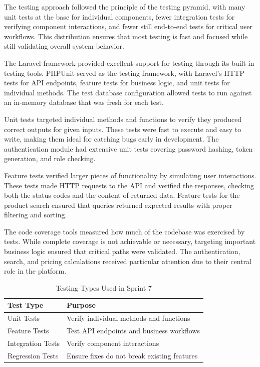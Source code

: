 The testing approach followed the principle of the testing
pyramid, with many unit tests at the base for individual
components, fewer integration tests for verifying component
interactions, and fewer still end-to-end tests for critical
user workflows. This distribution ensures that most testing
is fast and focused while still validating overall system
behavior.

The Laravel framework provided excellent support for testing
through its built-in testing tools. PHPUnit served as the
testing framework, with Laravel's HTTP tests for API endpoints,
feature tests for business logic, and unit tests for individual
methods. The test database configuration allowed tests to run
against an in-memory database that was fresh for each test.

Unit tests targeted individual methods and functions to verify
they produced correct outputs for given inputs. These tests were
fast to execute and easy to write, making them ideal for
catching bugs early in development. The authentication module
had extensive unit tests covering password hashing, token
generation, and role checking.

Feature tests verified larger pieces of functionality by
simulating user interactions. These tests made HTTP requests
to the API and verified the responses, checking both the
status codes and the content of returned data. Feature tests
for the product search ensured that queries returned expected
results with proper filtering and sorting.

The code coverage tools measured how much of the codebase
was exercised by tests. While complete coverage is not
achievable or necessary, targeting important business logic
ensured that critical paths were validated. The authentication,
search, and pricing calculations received particular attention
due to their central role in the platform.

\begin{table}[H]
\begin{center}
\begin{tabular}{|m{3.5cm}|m{5.5cm}|}
\hline
\textbf{Test Type} & \textbf{Purpose} \\ \hline
Unit Tests & Verify individual methods and functions \\ \hline
Feature Tests & Test API endpoints and business workflows \\ \hline
Integration Tests & Verify component interactions \\ \hline
Regression Tests & Ensure fixes do not break existing features \\ \hline
\end{tabular}
\caption{Testing Types Used in Sprint 7}
\label{tab:testing_types}
\end{center}
\end{table}

